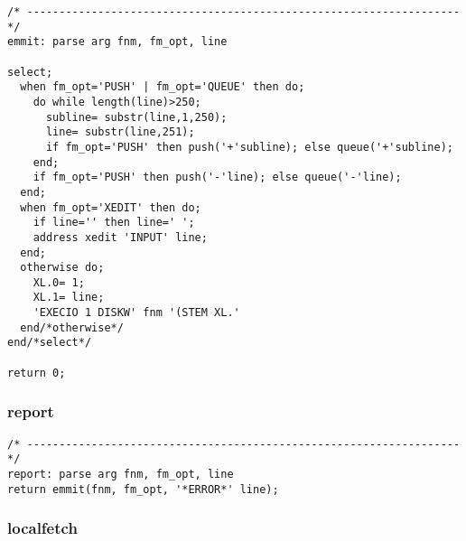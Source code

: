 \def\LPtopF{emmit}

\begin{verbatim}
/* ------------------------------------------------------------------- */
emmit: parse arg fnm, fm_opt, line

select;
  when fm_opt='PUSH' | fm_opt='QUEUE' then do;
    do while length(line)>250;
      subline= substr(line,1,250);
      line= substr(line,251);
      if fm_opt='PUSH' then push('+'subline); else queue('+'subline);
    end;
    if fm_opt='PUSH' then push('-'line); else queue('-'line);
  end;
  when fm_opt='XEDIT' then do;
    if line='' then line=' ';
    address xedit 'INPUT' line;
  end;
  otherwise do;
    XL.0= 1;
    XL.1= line;
    'EXECIO 1 DISKW' fnm '(STEM XL.'
  end/*otherwise*/
end/*select*/

return 0;
\end{verbatim}

\subsubsection{report}

\def\LPtopF{report}

\begin{verbatim}
/* ------------------------------------------------------------------- */
report: parse arg fnm, fm_opt, line
return emmit(fnm, fm_opt, '*ERROR*' line);
\end{verbatim}

\subsubsection{localfetch}

\def\LPtopF{localfetch}

